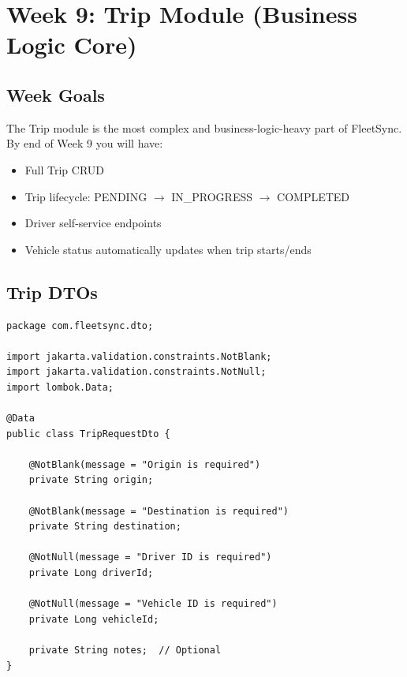 \documentclass[12pt,a4paper]{report}
\begin{document}
\chapter{Week 9: Trip Module (Business Logic Core)}

\section{Week Goals}

The Trip module is the most complex and business-logic-heavy part of FleetSync. By end of Week 9 you will have:
\begin{itemize}
  \item Full Trip CRUD
  \item Trip lifecycle: PENDING $\rightarrow$ IN\_PROGRESS $\rightarrow$ COMPLETED
  \item Driver self-service endpoints
  \item Vehicle status automatically updates when trip starts/ends
\end{itemize}

\section{Trip DTOs}

\begin{lstlisting}[caption=TripRequestDto.java]
package com.fleetsync.dto;

import jakarta.validation.constraints.NotBlank;
import jakarta.validation.constraints.NotNull;
import lombok.Data;

@Data
public class TripRequestDto {

    @NotBlank(message = "Origin is required")
    private String origin;

    @NotBlank(message = "Destination is required")
    private String destination;

    @NotNull(message = "Driver ID is required")
    private Long driverId;

    @NotNull(message = "Vehicle ID is required")
    private Long vehicleId;

    private String notes;  // Optional
}
\end{lstlisting}
\end{document}
